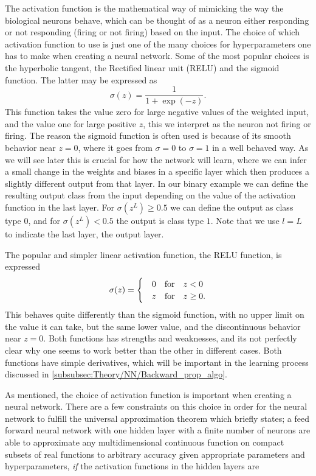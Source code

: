 \documentclass[10pt, twocolumn]{article}
\begin{document}
The activation function is the mathematical way of mimicking the way the biological neurons behave, which can be thought of as a neuron either responding or not responding (firing or not firing) based on the input. The choice of which activation function to use is just one of the many choices for hyperparameters one has to make when creating a neural network. Some of the most popular choices is the hyperbolic tangent, the Rectified linear unit (RELU) and the sigmoid function. The latter may be expressed as
\begin{equation}
    \sigma(z) = \frac{1}{1+\exp(-z)}.
    \label{eq:zigmoid_func}
\end{equation}
This function takes the value zero for large negative values of the weighted input, and the value one for large positive $z$, this we interpret as the neuron not firing or firing. The reason the sigmoid function is often used is because of its smooth behavior near $z=0$, where it goes from $\sigma = 0$ to $\sigma =1$ in a well behaved way. As we will see later this is crucial for how the network will learn, where we can infer a small change in the weights and biases in a specific layer which then produces a slightly different output from that layer. In our binary example we can define the resulting output class from the input depending on the value of the activation function in the last layer. For $\sigma(z^L) \geq 0.5$ we can define the output as class type $0$, and for $\sigma(z^L) < 0.5$ the output is class type $1$. Note that we use $l=L$ to indicate the last layer, the output layer.

The popular and simpler linear activation function, the RELU function, is expressed
\begin{equation}
    \sigma(z) =
    \begin{cases}
    & 0 \qfor z<0
    \\
    & z\qfor z\geq 0.%
    \end{cases}
    \label{eq:RELU_func}
\end{equation}
This behaves quite differently than the sigmoid function, with no upper limit on the value it can take, but the same lower value, and the discontinuous behavior near $z=0$. Both functions has strengths and weaknesses, and its not perfectly clear why one seems to work better than the other in different cases. Both functions have simple derivatives, which will be important in the learning process discussed in \cref{subsubsec:Theory/NN/Backward_prop_algo}.


As mentioned, the choice of activation function is important when creating a neural network. There are a few constraints on this choice in order for the neural network to fulfill the universal approximation theorem which briefly states; a feed forward neural network with one hidden layer with a finite number of neurons are able to approximate any multidimensional continuous function on compact subsets of real functions to arbitrary accuracy given appropriate parameters and hyperparameters, \textit{if} the activation functions in the hidden layers are
\end{document}
